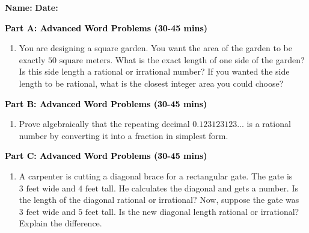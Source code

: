 \documentclass[12pt, letterpaper, fleqn]{article}
\begin{document}
\textbf{Name:} \underline{\hspace{5cm}}
\hfill
\textbf{Date:} \underline{\hspace{3cm}}\\


\begin{tcolorbox}[colback=customteal!20]
\large\textcolor{black}{\textbf{Part A: Advanced Word Problems (30-45 mins)}}
\end{tcolorbox}

\vspace{3mm}

\begin{enumerate}[itemsep=5.5cm, leftmargin=0.6cm]
\item You are designing a square garden. You want the area of the garden to be exactly $50\text{ square meters}$. What is the exact length of one side of the garden? Is this side length a rational or irrational number? If you wanted the side length to be rational, what is the closest integer area you could choose?
\end{enumerate}

\newpage

\begin{tcolorbox}[colback=customteal!20]
\large\textcolor{black}{\textbf{Part B: Advanced Word Problems (30-45 mins)}}
\end{tcolorbox}

\vspace{3mm}

\begin{enumerate}[itemsep=5.5cm, leftmargin=0.6cm, resume]
\item Prove algebraically that the repeating decimal $0.123123123...$ is a rational number by converting it into a fraction in simplest form.
\end{enumerate}

\newpage

\begin{tcolorbox}[colback=customteal!20]
\large\textcolor{black}{\textbf{Part C: Advanced Word Problems (30-45 mins)}}
\end{tcolorbox}

\vspace{3mm}

\begin{enumerate}[itemsep=5.5cm, leftmargin=0.6cm, resume]
\item A carpenter is cutting a diagonal brace for a rectangular gate. The gate is $3\text{ feet}$ wide and $4\text{ feet}$ tall. He calculates the diagonal and gets a number. Is the length of the diagonal rational or irrational? Now, suppose the gate was $3\text{ feet}$ wide and $5\text{ feet}$ tall. Is the new diagonal length rational or irrational? Explain the difference.
\end{enumerate}
\end{document}
